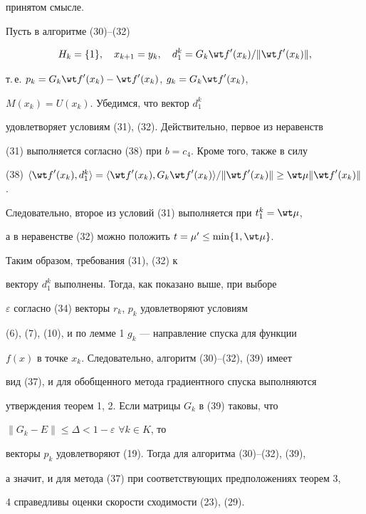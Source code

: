 принятом смысле.





Пусть в алгоритме (30)--(32)


\begin{equation}


H_k=\{1\},\quad x_{k+1}=y_k,\quad


d_1^k=G_k{\wt f}'(x_k)/\|{{\wt f}'(x_k)}\|,


\end{equation}


т.\,е. $p_k=G_k{\wt f}'(x_k)-{\wt f}'(x_k)$, $g_k=G_k{\wt f}'(x_k)$,


$M(x_k)=U(x_k)$. Убедимся, что вектор $d_1^k$


удовлетворяет условиям (31), (32). Действительно, первое из неравенств


(31) выполняется согласно (38) при $b=c_4$. Кроме того, также в силу


(38) $\langle {{\wt f}'(x_k),d_1^k}\rangle =\langle


{{\wt f}'(x_k),G_k{\wt f}'(x_k)}\rangle /\|{{\wt f}'(x_k)}


\|\ge\wt\mu\|{{\wt f}'(x_k)}\|$.


Следовательно, второе из условий (31) выполняется при $t_1^k=\wt\mu$,


а в неравенстве (32) можно положить $t={\mu}'\le\min\{{1,\wt\mu}\}$.


Таким образом, требования (31), (32) к


вектору $d_1^k$ выполнены. Тогда, как показано выше, при выборе


$\varepsilon$ согласно (34) векторы $r_k$, $p_k$ удовлетворяют условиям


(6), (7), (10), и по лемме 1 $g_k$ --- направление спуска для функции


$f(x)$ в точке $x_k$. Следовательно, алгоритм (30)--(32), (39) имеет


вид (37), и для обобщенного метода градиентного спуска выполняются


утверждения теорем 1, 2. Если матрицы $G_k$ в (39) таковы, что


$\|{G_k-E}\|\le\Delta<1-\varepsilon$ $\forall k\in K$, то


векторы $p_k$ удовлетворяют (19). Тогда для алгоритма (30)--(32), (39),


а значит, и для метода (37) при соответствующих предположениях теорем 3,


4 справедливы оценки скорости сходимости (23), (29).





